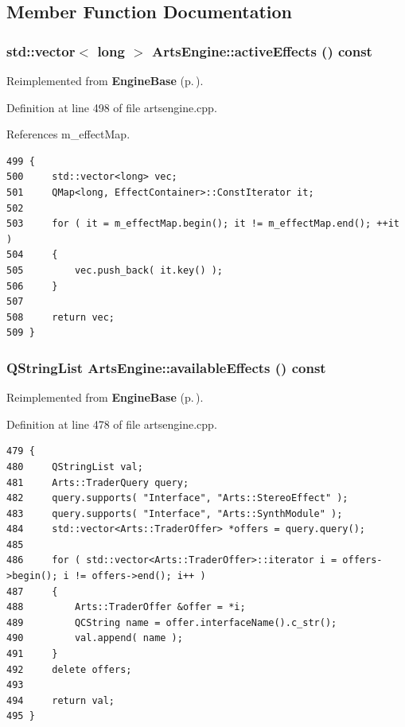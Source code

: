\subsection{Member Function Documentation}
\subsubsection{\setlength{\rightskip}{0pt plus 5cm}std::vector$<$ long $>$ Arts\-Engine::active\-Effects () const\hspace{0.3cm}{\tt  [virtual]}}\label{classArtsEngine_ArtsEnginea11}




Reimplemented from {\bf Engine\-Base} {\rm (p.\,\pageref{classEngineBase_EngineBasea17})}.

Definition at line 498 of file artsengine.cpp.

References m\_\-effect\-Map.



\footnotesize\begin{verbatim}499 {
500     std::vector<long> vec;
501     QMap<long, EffectContainer>::ConstIterator it;
502 
503     for ( it = m_effectMap.begin(); it != m_effectMap.end(); ++it )
504     {
505         vec.push_back( it.key() );
506     }
507 
508     return vec;
509 }
\end{verbatim}\normalsize 
{}
\subsubsection{\setlength{\rightskip}{0pt plus 5cm}QString\-List Arts\-Engine::available\-Effects () const\hspace{0.3cm}{\tt  [virtual]}}\label{classArtsEngine_ArtsEnginea10}




Reimplemented from {\bf Engine\-Base} {\rm (p.\,\pageref{classEngineBase_EngineBasea16})}.

Definition at line 478 of file artsengine.cpp.



\footnotesize\begin{verbatim}479 {
480     QStringList val;
481     Arts::TraderQuery query;
482     query.supports( "Interface", "Arts::StereoEffect" );
483     query.supports( "Interface", "Arts::SynthModule" );
484     std::vector<Arts::TraderOffer> *offers = query.query();
485 
486     for ( std::vector<Arts::TraderOffer>::iterator i = offers->begin(); i != offers->end(); i++ )
487     {
488         Arts::TraderOffer &offer = *i;
489         QCString name = offer.interfaceName().c_str();
490         val.append( name );
491     }
492     delete offers;
493 
494     return val;
495 }
\end{verbatim}\normalsize 
{}
